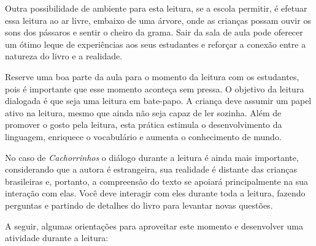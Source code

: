 \documentclass[11pt]{extarticle}
\begin{document}

Outra possibilidade de ambiente para esta leitura, se a escola permitir, 
é efetuar essa leitura ao ar livre, embaixo de uma árvore, onde as crianças 
possam ouvir os sons dos pássaros e sentir o cheiro da grama. Sair da sala 
de aula pode oferecer um ótimo leque de experiências aos seus estudantes e 
reforçar a conexão entre a natureza do livro e a realidade.  

Reserve uma boa parte da aula para o momento da leitura com os estudantes, 
pois é importante que esse momento aconteça sem pressa. O objetivo da 
leitura dialogada é que seja uma leitura em bate-papo. A criança deve 
assumir um papel ativo na leitura, mesmo que ainda não seja capaz de 
ler sozinha. Além de promover o gosto pela leitura, esta prática estimula 
o desenvolvimento da linguagem, enriquece o vocabulário e 
aumenta o conhecimento de mundo.

No caso de \textit{Cachorrinhos} o diálogo durante a leitura é 
ainda mais importante, considerando que a autora é estrangeira, sua realidade é distante das crianças brasileiras e, portanto, a compreensão do texto se apoiará principalmente na sua interação com elas. 
Você deve interagir com eles durante toda a 
leitura, fazendo perguntas e partindo de detalhes do livro para 
levantar novas questões. 

A seguir, algumas orientações para aproveitar este momento e desenvolver uma atividade durante a leitura: 
\end{document}
